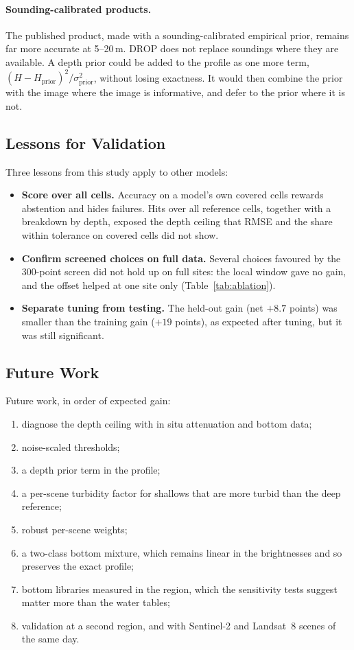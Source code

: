 \documentclass[remotesensing,article,submit,pdftex]{Definitions/mdpi}
\begin{document}
\paragraph{Sounding-calibrated products.} The published product, made with a sounding-calibrated empirical prior, remains far more accurate at 5--20\,m. DROP does not replace soundings where they are available. A depth prior could be added to the profile as one more term, $(H - H_\mathrm{prior})^2/\sigma_\mathrm{prior}^2$, without losing exactness. It would then combine the prior with the image where the image is informative, and defer to the prior where it is not.

\subsection{Lessons for Validation}

Three lessons from this study apply to other models:
\begin{itemize}
\item \textbf{Score over all cells.} Accuracy on a model's own covered cells rewards abstention and hides failures. Hits over all reference cells, together with a breakdown by depth, exposed the depth ceiling that RMSE and the share within tolerance on covered cells did not show.
\item \textbf{Confirm screened choices on full data.} Several choices favoured by the 300-point screen did not hold up on full sites: the local window gave no gain, and the offset helped at one site only (Table~\ref{tab:ablation}).
\item \textbf{Separate tuning from testing.} The held-out gain (net $+8.7$ points) was smaller than the training gain ($+19$ points), as expected after tuning, but it was still significant.
\end{itemize}

\subsection{Future Work}

Future work, in order of expected gain:
\begin{enumerate}
\item diagnose the depth ceiling with in situ attenuation and bottom data;
\item noise-scaled thresholds;
\item a depth prior term in the profile;
\item a per-scene turbidity factor for shallows that are more turbid than the deep reference;
\item robust per-scene weights;
\item a two-class bottom mixture, which remains linear in the brightnesses and so preserves the exact profile;
\item bottom libraries measured in the region, which the sensitivity tests suggest matter more than the water tables;
\item validation at a second region, and with Sentinel-2 and Landsat~8 scenes of the same day.
\end{enumerate}
\end{document}
